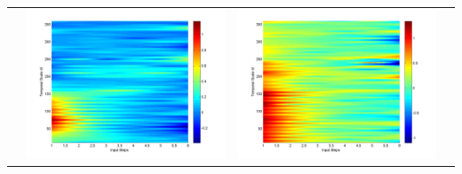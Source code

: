 \documentclass[11pt]{article}
\begin{document}
\begin{table}[H]
{\begin{tabular}{cccc}
&\begin{minipage}{.3\textwidth}\includegraphics[width=\linewidth]{resultgraph/11532500pdiff_former.png}\end{minipage}
&\begin{minipage}{.3\textwidth}\includegraphics[width=\linewidth]{resultgraph/11532500epdiff_former.png}\end{minipage}

\end{tabular}}
\end{table}
\end{document}
